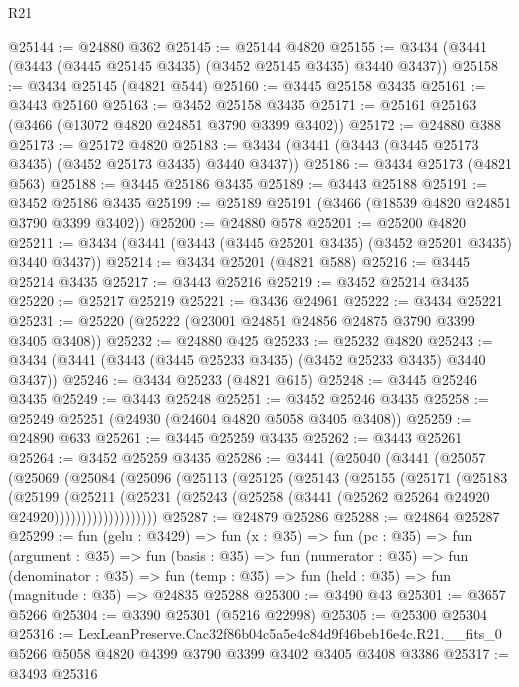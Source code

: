 \begin{lexlean}{R21}
\begin{coremodule}
@25144 := @24880 @362
@25145 := @25144 @4820
@25155 := @3434 (@3441 (@3443 (@3445 @25145 @3435) (@3452 @25145 @3435) @3440 @3437))
@25158 := @3434 @25145 (@4821 @544)
@25160 := @3445 @25158 @3435
@25161 := @3443 @25160
@25163 := @3452 @25158 @3435
@25171 := @25161 @25163 (@3466 (@13072 @4820 @24851 @3790 @3399 @3402))
@25172 := @24880 @388
@25173 := @25172 @4820
@25183 := @3434 (@3441 (@3443 (@3445 @25173 @3435) (@3452 @25173 @3435) @3440 @3437))
@25186 := @3434 @25173 (@4821 @563)
@25188 := @3445 @25186 @3435
@25189 := @3443 @25188
@25191 := @3452 @25186 @3435
@25199 := @25189 @25191 (@3466 (@18539 @4820 @24851 @3790 @3399 @3402))
@25200 := @24880 @578
@25201 := @25200 @4820
@25211 := @3434 (@3441 (@3443 (@3445 @25201 @3435) (@3452 @25201 @3435) @3440 @3437))
@25214 := @3434 @25201 (@4821 @588)
@25216 := @3445 @25214 @3435
@25217 := @3443 @25216
@25219 := @3452 @25214 @3435
@25220 := @25217 @25219
@25221 := @3436 @24961
@25222 := @3434 @25221
@25231 := @25220 (@25222 (@23001 @24851 @24856 @24875 @3790 @3399 @3405 @3408))
@25232 := @24880 @425
@25233 := @25232 @4820
@25243 := @3434 (@3441 (@3443 (@3445 @25233 @3435) (@3452 @25233 @3435) @3440 @3437))
@25246 := @3434 @25233 (@4821 @615)
@25248 := @3445 @25246 @3435
@25249 := @3443 @25248
@25251 := @3452 @25246 @3435
@25258 := @25249 @25251 (@24930 (@24604 @4820 @5058 @3405 @3408))
@25259 := @24890 @633
@25261 := @3445 @25259 @3435
@25262 := @3443 @25261
@25264 := @3452 @25259 @3435
@25286 := @3441
    (@25040
      (@3441
        (@25057
          (@25069
            (@25084
              (@25096
                (@25113
                  (@25125
                    (@25143
                      (@25155
                        (@25171
                          (@25183
                            (@25199
                              (@25211
                                (@25231
                                  (@25243
                                    (@25258 (@3441 (@25262 @25264 @24920 @24920)))))))))))))))))))
@25287 := @24879 @25286
@25288 := @24864 @25287
@25299 := fun (gelu : @3429) =>
  fun (x : @35) =>
  fun (pc : @35) =>
  fun (argument : @35) =>
  fun (basis : @35) =>
  fun (numerator : @35) =>
  fun (denominator : @35) =>
  fun (temp : @35) => fun (held : @35) => fun (magnitude : @35) => @24835 @25288
@25300 := @3490 @43
@25301 := @3657 @5266
@25304 := @3390 @25301 (@5216 @22998)
@25305 := @25300 @25304
@25316 := LexLeanPreserve.Cac32f86b04c5a5e4c84d9f46beb16e4c.R21.__fits_0
    @5266
    @5058
    @4820
    @4399
    @3790
    @3399
    @3402
    @3405
    @3408
    @3386
@25317 := @3493 @25316

\end{coremodule}
\end{lexlean}
